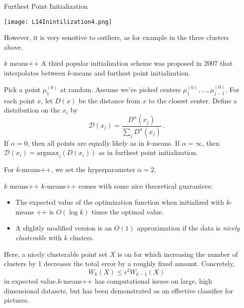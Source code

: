 \documentclass[10pt, table, dvipsnames,xcdraw,handout]{beamer}
\begin{document}
\begin{frame}[fragile]{Furthest Point Initialization}
  \begin{minipage}[t][0.5\textheight][t]{\textwidth}
	\centering \texttt{[image: L14Inintilization4.png]} 
  \end{minipage}
  \vfill
\begin{minipage}[t][0.5\textheight][t]{\textwidth}
However, it is very sensitive to outliers, as for example in the three clusters above. 
\end{minipage}
\end{frame}









\begin{frame}[fragile]{$k$ means++}
A third popular initialization scheme was proposed in 2007 that interpolates between $k$-means and furthest point initialization. 

Pick a point $\mu^{(0)}_{1}$ at random. Assume we've picked centers $\mu^{(0)}_{1},\ldots, \mu^{(0)}_{j-1}$. For each point $x$, let $D(x)$ be the distance from $x$ to the closest center. Define a distribution on the $x_i$ by
$$
\mathcal{D}(x_i) = \frac{D^\alpha(x_j)}{\sum_j D^\alpha(x_j)}\,.
$$\pause
If $\alpha=0$, then all points are equally likely as in $k$-means. If $\alpha = \infty$, then $\mathcal{D}(x_i) = \text{argmax}_i(D(x_i))$ as in furthest point initialization. \pause

For $k$-means++, we set the hyperparameter $\alpha = 2$.

\end{frame}





\begin{frame}[fragile]{$k$ means++}
$k$-means++ comes with some nice theoretical guarantees: 
\begin{itemize}
\item The expected value of the optimization function when initialized with $k$-means ++ is $O(\log k)$ times the optimal value. 

\item A slightly modified version is an $O(1)$ approximation if the data is \emph{nicely clusterable} with $k$ clusters.
\end{itemize} 

Here, a nicely clusterable point set $X$ is on for which increasing the number of clusters by 1 decreases the total error by a roughly fixed amount. Concretely,
$$
W_k(X) \leq \epsilon^2 W_{k-1}(X) 
$$
in expected value.\pause $k$-means++ has computational issues on large, high dimensional datasets, but has been demonstrated as an effective classifier for pictures.\hyperlink{reference}{}
\end{frame}
\end{document}
